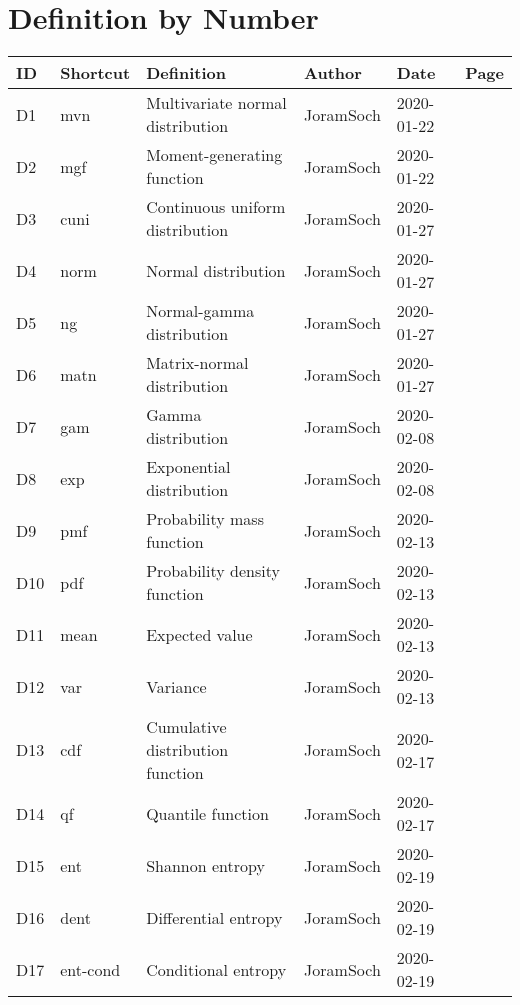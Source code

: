 \documentclass[a4paper,12pt,twoside]{book}
\begin{document}
\pagebreak
\section{Definition by Number}

\begin{longtable}{|p{1cm}|p{2cm}|p{6.5cm}|p{3cm}|p{2cm}|c|}
\hline
\textbf{ID} & \textbf{Shortcut} & \textbf{Definition} & \textbf{Author} & \textbf{Date} & \textbf{Page} \\ \hline
D1 & mvn & Multivariate normal distribution & JoramSoch & 2020-01-22 & \pageref{sec:mvn} \\ \hline
D2 & mgf & Moment-generating function & JoramSoch & 2020-01-22 & \pageref{sec:mgf} \\ \hline
D3 & cuni & Continuous uniform distribution & JoramSoch & 2020-01-27 & \pageref{sec:cuni} \\ \hline
D4 & norm & Normal distribution & JoramSoch & 2020-01-27 & \pageref{sec:norm} \\ \hline
D5 & ng & Normal-gamma distribution & JoramSoch & 2020-01-27 & \pageref{sec:ng} \\ \hline
D6 & matn & Matrix-normal distribution & JoramSoch & 2020-01-27 & \pageref{sec:matn} \\ \hline
D7 & gam & Gamma distribution & JoramSoch & 2020-02-08 & \pageref{sec:gam} \\ \hline
D8 & exp & Exponential distribution & JoramSoch & 2020-02-08 & \pageref{sec:exp} \\ \hline
D9 & pmf & Probability mass function & JoramSoch & 2020-02-13 & \pageref{sec:pmf} \\ \hline
D10 & pdf & Probability density function & JoramSoch & 2020-02-13 & \pageref{sec:pdf} \\ \hline
D11 & mean & Expected value & JoramSoch & 2020-02-13 & \pageref{sec:mean} \\ \hline
D12 & var & Variance & JoramSoch & 2020-02-13 & \pageref{sec:var} \\ \hline
D13 & cdf & Cumulative distribution function & JoramSoch & 2020-02-17 & \pageref{sec:cdf} \\ \hline
D14 & qf & Quantile function & JoramSoch & 2020-02-17 & \pageref{sec:qf} \\ \hline
D15 & ent & Shannon entropy & JoramSoch & 2020-02-19 & \pageref{sec:ent} \\ \hline
D16 & dent & Differential entropy & JoramSoch & 2020-02-19 & \pageref{sec:dent} \\ \hline
D17 & ent-cond & Conditional entropy & JoramSoch & 2020-02-19 & \pageref{sec:ent-cond} \\ \hline

\end{longtable}
\end{document}
